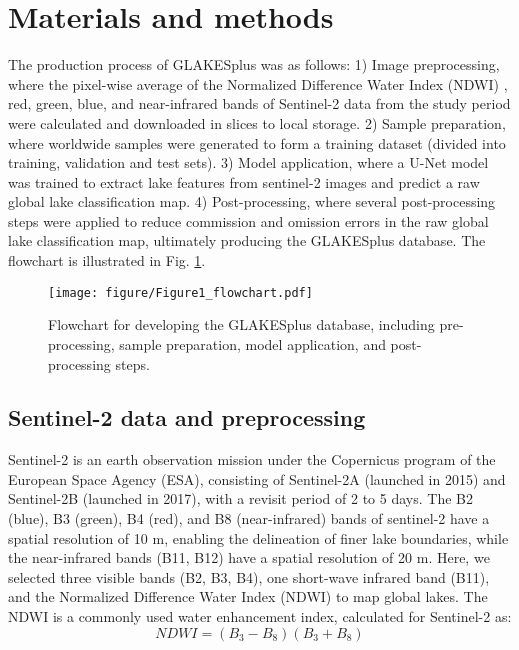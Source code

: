 \documentclass[preprint,12pt,authoryear]{elsarticle}
\begin{document}
\section{Materials and methods}
\label{sec2}
The production process of GLAKESplus was as follows: 1) Image preprocessing, where the pixel-wise average of the Normalized Difference Water Index (NDWI) \citep{mcfeeters_use_1996}, red, green, blue, and near-infrared bands of Sentinel-2 data from the study period were calculated and downloaded in slices to local storage. 2) Sample preparation, where worldwide samples were generated to form a training dataset (divided into training, validation and test sets). 3) Model application, where a U-Net model was trained to extract lake features from sentinel-2 images and predict a raw global lake classification map. 4) Post-processing, where several post-processing steps were applied to reduce commission and omission errors in the raw global lake classification map, ultimately producing the GLAKESplus database. The flowchart is illustrated in Fig. \ref{fig:Fig1}.

\begin{figure}[h]
    \centering
    \texttt{[image: figure/Figure1\_flowchart.pdf]}
    \caption{Flowchart for developing the GLAKESplus database, including pre-processing, sample preparation, model application, and post-processing steps.}
    \label{fig:Fig1}
\end{figure}

\subsection{Sentinel-2 data and preprocessing}
\label{subsec1}

Sentinel-2 is an earth observation mission under the Copernicus program of the European Space Agency (ESA), consisting of Sentinel-2A (launched in 2015) and Sentinel-2B (launched in 2017), with a revisit period of 2 to 5 days. The B2 (blue), B3 (green), B4 (red), and B8 (near-infrared) bands of sentinel-2 have a spatial resolution of 10 m, enabling the delineation of finer lake boundaries, while the near-infrared bands (B11, B12) have a spatial resolution of 20 m. Here, we selected three visible bands (B2, B3, B4), one short-wave infrared band (B11), and the Normalized Difference Water Index (NDWI)\citep{mcfeeters_use_1996} to map global lakes.
 The NDWI is a commonly used water enhancement index, calculated for Sentinel-2 as:
\begin{equation}
NDWI = (B_3-B_8)(B_3+B_8)
\end{equation}
\end{document}
